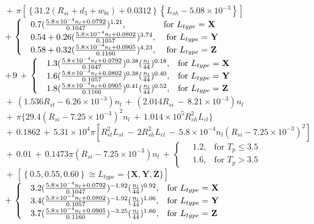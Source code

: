 \begin{singlespacing}
\begin{flushleft}
$
\, + \, \pi \left[ \left\{ 31.2( R_{si} + d_{3} + w_{bi}) + 0.0312 \right\} \left\{ L_{sh} - 5.08 \times 10^{-3} \right\} \right]
$\\
$
\, + \, 
\begin{cases}
\quad 0.7(\frac{5.8 \times 10^{-4} n_{l} + 0.0792}{0.1047})^{1.21},  & \text{for $L_{type} = $ \textbf{X}} \\
\quad 0.54 + 0.26( \frac{5.8 \times 10^{-4} n_{l} + 0.0802}{0.1057})^{3.74}, & \text{ for $L_{type} =$ \textbf{Y}} \\
\quad 0.58 + 0.32( \frac{5.8 \times 10^{-4} n_{l} + 0.0905}{0.1160})^{4.23}, & \text{ for $L_{type} =$ \textbf{Z}} \\
\end{cases}
$\\
$ \, + \, 9 \, + \, \begin{cases}
\quad 1.3(\frac{5.8 \times 10^{-4} n_{l} + 0.0792}{0.1047})^{0.38} (\frac{n_{l}}{44})^{0.18}, & \text{for $L_{type} =$ \textbf{X}} \\
\quad 1.6(\frac{5.8 \times 10^{-4} n_{l} + 0.0802}{0.1057})^{0.38} (\frac{n_{l}}{44})^{0.40}, & \text{for $L_{type} =$ \textbf{Y}} \\
\quad 1.8(\frac{5.8 \times 10^{-4} n_{l} + 0.0905}{0.1160})^{0.41} (\frac{n_{l}}{44})^{0.52}, & \text{for $L_{type} =$ \textbf{Z}}
\end{cases}
$\\
$
\, + \, (1.536 R_{st} - 6.26 \times 10^{-3}) n_{l} \, + \, (2.014 R_{si} \, - \, 8.21 \times 10^{-3}) n_{l}
$\\
$
\, + \, \pi \{29.4(R_{si} - 7.25 \times 10^{-3})^{2} n_{l} \, + \, 1.014 \times 10^{5} R_{sh}^{2} L_{cl}\} 
$\\
$
\, + \, 0.1862 \, + \, 5.31 \times 10^{4} \pi [ R_{st}^{2} L_{st} \, - \,  2 R_{sh}^{2} L_{cl} 
\, - \, 5.8 \times 10^{-4} n_{l}(R_{si} - 7.25 \times 10^{-3})^{2}] 
$\\
$
 \, + \, 0.01 \, + \,0.1473 \pi (R_{si} - 7.25 \times 10^{-3}) n_{l} \, + \, \begin{cases}
\quad 1.2, & \text{for $T_{p} \le 3.5$} \\
\quad 1.6, & \text{for $T_{p} > 3.5$} 
\end{cases}
$\\
$
\, + \, \left[ \left\{ 0.5, 0.55, 0.60 \right\} \cong L_{type} = \{ \textbf{X}, \textbf{Y}, \textbf{Z} \} \right]
$\\
$
\, + \, \begin{cases}
\quad 3.2(\frac{5.8 \times 10^{-4} n_{l} + 0.0792}{0.1047})^{-1.92}(\frac{n_{l}}{44})^{0.92}, & \text{for $L_{type} = $ \textbf{X}} \\ 
\quad 3.4(\frac{5.8 \times 10^{-4} n_{l} + 0.0802}{0.1057})^{-1.92}(\frac{n_{l}}{44})^{1.06}, & \text{for $L_{type} = $ \textbf{Y}} \\ 
\quad 3.7(\frac{5.8 \times 10^{-4} n_{l} + 0.0905}{0.1160})^{-3.25}(\frac{n_{l}}{44})^{1.60}, & \text{for $L_{type} = $ \textbf{Z}} 
\end{cases}
$
\\[\baselineskip]


\end{flushleft}
\end{singlespacing}
